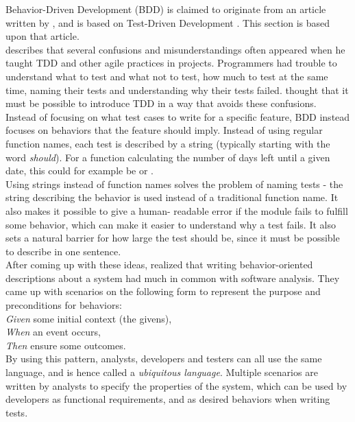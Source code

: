 Behavior-Driven Development (BDD) is claimed to originate from an
article written by \citet{web:dan_north}, and is based on Test-Driven
Development \cite{wiki:bdd}. This section is based upon that article.\\

\citeauthor{web:dan_north} describes that several confusions and
misunderstandings often appeared when he taught TDD and other agile
practices in projects. Programmers had trouble to understand what to
test and what not to test, how much to test at the same time, naming
their tests and understanding why their tests failed.
\citeauthor{web:dan_north} thought that it must be possible to introduce
TDD in a way that avoids these confusions.\\

Instead of focusing on what test cases to write for a specific feature,
BDD instead focuses on behaviors that the feature should imply. Instead
of using regular function names, each test is described by a string
(typically starting with the word \emph{should}). For a function
calculating the number of days left until a given date, this could for
example be  or
.\\

Using strings instead of function names solves the problem of naming
tests - the string describing the behavior is used instead of a
traditional function name. It also makes it possible to give a human-
readable error if the module fails to fulfill some behavior, which can
make it easier to understand why a test fails. It also sets a natural
barrier for how large the test should be, since it must be possible to
describe in one sentence.\\

After coming up with these ideas, \citeauthor{web:dan_north} realized
that writing behavior-oriented descriptions about a system had much in
common with software analysis. They came up with scenarios on the
following form to represent the purpose and preconditions for
behaviors:\\

\emph{Given} some initial context (the givens),\\
\emph{When} an event occurs,\\
\emph{Then} ensure some outcomes.\\

By using this pattern, analysts, developers and testers can all use the
same language, and is hence called a \emph{ubiquitous language}. Multiple
scenarios are written by analysts to specify the properties of the
system, which can be used by developers as functional requirements, and
as desired behaviors when writing tests.\\
